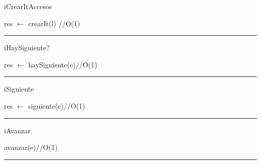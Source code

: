 \begin{algorithm}[H]
\caption{iCrearItAccesos}
\begin{algorithmic}[1]
\State res $\gets$ crearIt(l) \hfill //O(1)
\EndFunction 
\end{algorithmic}
\hrule
{}
\end{algorithm}

\begin{algorithm}[H]
\caption{iHaySiguiente?}
\begin{algorithmic}[1]
\state res $\gets$ haySiguiente(e)\hfill //O(1)
\EndFunction 
\end{algorithmic}
\hrule
{}
\end{algorithm}

\begin{algorithm}[H]
\caption{iSiguiente}
\begin{algorithmic}[1]
\state res $\gets$ siguiente(e)\hfill //O(1)
\EndFunction 
\end{algorithmic}
\hrule
{}
\end{algorithm}

\begin{algorithm}[H]
\caption{iAvanzar}
\begin{algorithmic}[1]
\state avanzar(e)\hfill //O(1)
\EndFunction 
\end{algorithmic}
\hrule
{}
\end{algorithm}